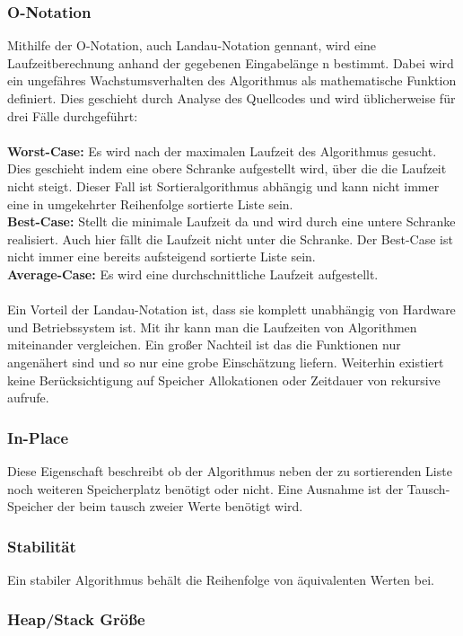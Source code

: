 \documentclass{article}
\begin{document}
\subsubsection{O-Notation}
Mithilfe der O-Notation, auch Landau-Notation gennant, wird eine Laufzeitberechnung anhand der gegebenen Eingabelänge n bestimmt. Dabei wird ein ungefähres Wachstumsverhalten des Algorithmus als mathematische Funktion definiert. Dies geschieht durch Analyse des Quellcodes und wird üblicherweise für drei Fälle durchgeführt: \\ \\
\textbf {Worst-Case:} Es wird nach der maximalen Laufzeit des Algorithmus gesucht. Dies geschieht indem eine obere Schranke aufgestellt wird, über die die Laufzeit nicht steigt. Dieser Fall ist Sortieralgorithmus abhängig und kann nicht immer eine in umgekehrter Reihenfolge sortierte Liste sein.   \\
\textbf {Best-Case:} Stellt die minimale Laufzeit da und wird durch eine untere Schranke realisiert. Auch hier fällt die Laufzeit nicht unter die Schranke. Der Best-Case ist nicht immer eine bereits aufsteigend sortierte Liste sein.\\
\textbf {Average-Case:} Es wird eine durchschnittliche Laufzeit aufgestellt. \\ \\
Ein Vorteil der Landau-Notation ist, dass sie komplett unabhängig von Hardware und Betriebssystem ist. Mit ihr kann man die Laufzeiten von Algorithmen miteinander vergleichen.
Ein großer Nachteil ist das die Funktionen nur angenähert sind und so nur eine grobe Einschätzung liefern. Weiterhin existiert keine Berücksichtigung auf Speicher Allokationen oder Zeitdauer von  rekursive aufrufe.

\subsubsection{In-Place}
Diese Eigenschaft beschreibt ob der Algorithmus neben der zu sortierenden Liste noch weiteren Speicherplatz benötigt oder nicht. Eine Ausnahme ist der Tausch-Speicher der beim tausch zweier Werte benötigt wird.
\subsubsection{Stabilität}
Ein stabiler Algorithmus behält die Reihenfolge von äquivalenten Werten bei.
\subsubsection{Heap/Stack Größe}
\end{document}
